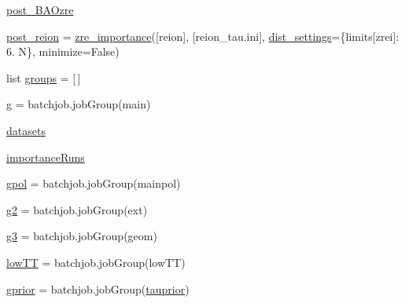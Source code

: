 \begin{DoxyCompactItemize}
\item 
\mbox{\hyperlink{namespaceplanck_1_1settings__planck__2015_a1e9a3bd9340291060ffbabeb3e233b72}{post\+\_\+\+B\+A\+Ozre}}
\item 
\mbox{\hyperlink{namespaceplanck_1_1settings__planck__2015_afe786a40c262bd9183dd458509ae3490}{post\+\_\+reion}} = \mbox{\hyperlink{classplanck_1_1settings__planck__2015_1_1zre__importance}{zre\+\_\+importance}}(\mbox{[}\textquotesingle{}reion\textquotesingle{}\mbox{]}, \mbox{[}\textquotesingle{}reion\+\_\+tau.\+ini\textquotesingle{}\mbox{]}, \mbox{\hyperlink{namespaceplanck_1_1settings__planck__2015_a168acdeb73e627d1f1dcf9e11ba082b1}{dist\+\_\+settings}}=\{\textquotesingle{}limits\mbox{[}zrei\mbox{]}\textquotesingle{}\+: \textquotesingle{}6. N\textquotesingle{}\}, minimize=False)
\item 
list \mbox{\hyperlink{namespaceplanck_1_1settings__planck__2015_a3742f5a3d6db8f7854cf6aebc9f74034}{groups}} = \mbox{[}$\,$\mbox{]}
\item 
\mbox{\hyperlink{namespaceplanck_1_1settings__planck__2015_ac2404ed8b3099ad05ff57c9f73610376}{g}} = batchjob.\+job\+Group(\textquotesingle{}main\textquotesingle{})
\item 
\mbox{\hyperlink{namespaceplanck_1_1settings__planck__2015_aa13afadb6840cd2d5e6244fbc2c0b96e}{datasets}}
\item 
\mbox{\hyperlink{namespaceplanck_1_1settings__planck__2015_a5df9d3e6932fa5793f468f21a504d200}{importance\+Runs}}
\item 
\mbox{\hyperlink{namespaceplanck_1_1settings__planck__2015_a56bf5da788f071724bcb879fc0043bcd}{gpol}} = batchjob.\+job\+Group(\textquotesingle{}mainpol\textquotesingle{})
\item 
\mbox{\hyperlink{namespaceplanck_1_1settings__planck__2015_af67ba47e9918cb42c535ad38ff9c310d}{g2}} = batchjob.\+job\+Group(\textquotesingle{}ext\textquotesingle{})
\item 
\mbox{\hyperlink{namespaceplanck_1_1settings__planck__2015_a5bea8ef38b2f56155b6add1ca8855da0}{g3}} = batchjob.\+job\+Group(\textquotesingle{}geom\textquotesingle{})
\item 
\mbox{\hyperlink{namespaceplanck_1_1settings__planck__2015_ac835137d68612642d07158d74b9165ee}{low\+TT}} = batchjob.\+job\+Group(\textquotesingle{}low\+TT\textquotesingle{})
\item 
\mbox{\hyperlink{namespaceplanck_1_1settings__planck__2015_ab72458737a3f39370ffc2388d169d898}{gprior}} = batchjob.\+job\+Group(\textquotesingle{}\mbox{\hyperlink{namespaceplanck_1_1settings__planck__2015_ac4cc3caefbd35ef6502ff098b7c6a229}{tauprior}}\textquotesingle{})

\end{DoxyCompactItemize}
